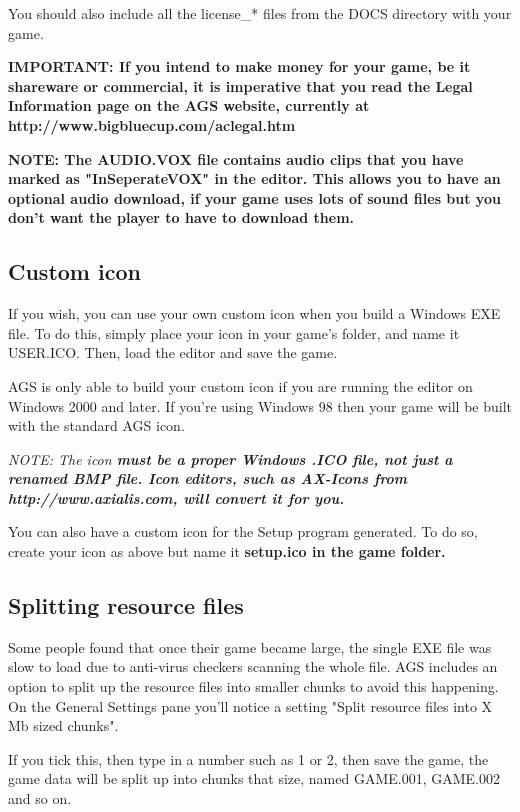 You should also include all the license_* files from the DOCS directory with your game.

\bf{IMPORTANT:} If you intend to make money for your game, be it shareware or commercial,
it is imperative that you read the Legal Information page on the AGS website, currently
at http://www.bigbluecup.com/aclegal.htm

\bf{NOTE:} The AUDIO.VOX file contains audio clips that you have marked as "InSeperateVOX"
in the editor. This allows you to have an optional audio download, if your game uses lots
of sound files but you don't want the player to have to download them.


\subsection{Custom icon}%

If you wish, you can use your own custom icon when you build a Windows EXE
file. To do this, simply place your icon in your game's folder, and name
it USER.ICO. Then, load the editor and save the game.

AGS is only able to build your custom icon if you are running the editor on
Windows 2000 and later. If you're using Windows 98 then your game will be
built with the standard AGS icon.

\it{NOTE: The icon \bf{must} be a proper Windows .ICO file, \bf{not} just a renamed
BMP file. Icon editors, such as AX-Icons from http://www.axialis.com, will convert
it for you.}

You can also have a custom icon for the Setup program generated. To do so, create
your icon as above but name it \bf{setup.ico} in the game folder.

\subsection{Splitting resource files}\label{SplitRes}%

Some people found that once their game became large, the single EXE file
was slow to load due to anti-virus checkers scanning the whole file.
AGS includes an option to split up the resource files into smaller chunks
to avoid this happening. On the General Settings pane you'll notice a
setting "Split resource files into X Mb sized chunks".

If you tick this, then type in a number such as 1 or 2, then save the game,
the game data will be split up into chunks that size, named GAME.001,
GAME.002 and so on.

